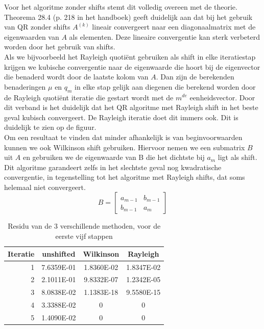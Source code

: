 \documentclass[a4paper, 12pt, titlepage]{report}
\begin{document}
Voor het algoritme zonder shifts stemt dit volledig overeen met de theorie. Theorema 28.4 (p. 218 in het handboek) geeft duidelijk aan dat bij het gebruik van QR zonder shifts $A^{(k)}$ lineair convergeert naar een diagonaalmatrix met de eigenwaarden van $A$ als elementen. Deze lineaire convergentie kan sterk verbeterd worden door het gebruik van shifts. \\
Als we bijvoorbeeld het Rayleigh quoti\"ent gebruiken als shift in elke iteratiestap krijgen we kubische convergentie naar de eigenwaarde die hoort bij de eigenvector die benaderd wordt door de laatste kolom van $A$. Dan zijn de berekenden benaderingen $\mu$ en $q_m$ in elke stap gelijk aan diegenen die berekend worden door de Rayleigh quoti\"ent iteratie die gestart wordt met de $m^{de}$ eenheidsvector. Door dit verband is het duidelijk dat het QR algoritme met Rayleigh shift in het beste geval kubisch convergeert. De Rayleigh iteratie doet dit immers ook. Dit is duidelijk te zien op de figuur. \\
Om een resultaat te vinden dat minder afhankelijk is van beginvoorwaarden kunnen we ook Wilkinson shift gebruiken. Hiervoor nemen we een submatrix $B$ uit $A$ en gebruiken we de eigenwaarde van B die het dichtste bij $a_m$ ligt als shift. Dit algoritme garandeert zelfs in het slechtste geval nog kwadratische convergentie, in tegenstelling tot het algoritme met Rayleigh shifts, dat soms helemaal niet convergeert.
\begin{equation}
 B=\begin{bmatrix} a_{m-1} & b_{m-1} \\ b_{m-1} & a_m\end{bmatrix}
\end{equation}


\begin{table}[h]
\begin{center}
\begin{tabular}{r||c|c|c}

Iteratie	&	\textbf{unshifted}	&	\textbf{Wilkinson}	&	\textbf{Rayleigh}	\\
\hline
1	&	7.6359E-01	&	1.8360E-02	&	1.8347E-02	\\
2	&	2.1011E-01	&	9.8332E-07	&	1.2342E-05	\\
3	&	8.0838E-02	&	1.1383E-18	&	9.5580E-15	\\
4	&	3.3388E-02	&	0		&		0	\\
5	&	1.4090E-02	&	0		&		0	\\

\end{tabular}
\caption{Residu van de 3 verschillende methoden, voor de eerste vijf stappen}
\label{errorQR}

\end{center}
\end{table}
\end{document}
